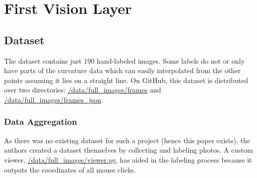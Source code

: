 \documentclass[a4paper,11pt]{report}
\begin{document}
            
    \chapter{First Vision Layer}
    
        \section{Dataset}
            The dataset contains just 190 hand-labeled images. Some labels do not or only have parts of the curvature data which can easily interpolated from the other points assuming it lies on a straight line. On GitHub, this dataset is distributed over two directories: \href{https://github.com/lenamerkli/ingredient-scanner/tree/main/data/full_images/frames}{/data/full\_images/frames} and \href{https://github.com/lenamerkli/ingredient-scanner/tree/main/data/full_images/frames_json}{/data/full\_images/frames\_json}.
    
            \subsection{Data Aggregation}
                As there was no existing dataset for such a project (hence this paper exists), the authors created a dataset themselves by collecting and labeling photos. A custom viewer, \href{https://github.com/lenamerkli/ingredient-scanner/tree/main/data/full_images/frames_json}{/data/full\_images/viewer.py}, has aided in the labeling process because it outputs the coordinates of all mouse clicks.
                
\end{document}
